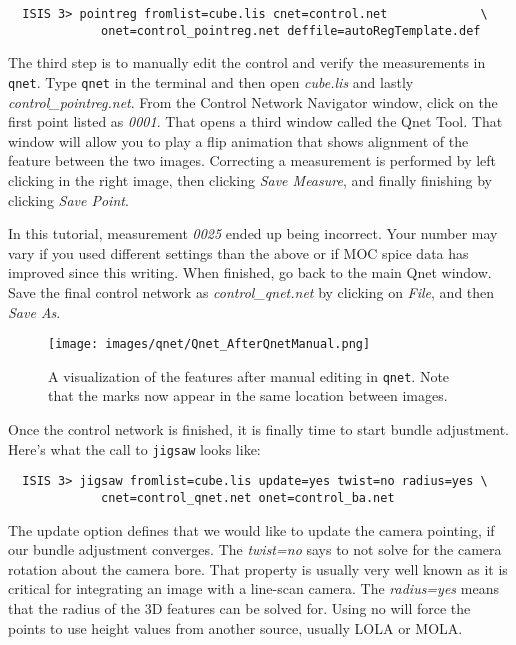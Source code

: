 \begin{verbatim}
  ISIS 3> pointreg fromlist=cube.lis cnet=control.net             \
             onet=control_pointreg.net deffile=autoRegTemplate.def
\end{verbatim}

The third step is to manually edit the control and verify the
measurements in \texttt{qnet}. Type \texttt{qnet} in the terminal and
then open \textit{cube.lis} and lastly
\textit{control\_pointreg.net}. From the Control Network Navigator
window, click on the first point listed as \textit{0001}. That opens a
third window called the Qnet Tool. That window will allow you to play
a flip animation that shows alignment of the feature between the two
images. Correcting a measurement is performed by left clicking in the
right image, then clicking \textit{Save Measure}, and finally
finishing by clicking \textit{Save Point}.

In this tutorial, measurement \textit{0025} ended up being
incorrect. Your number may vary if you used different settings than
the above or if MOC spice data has improved since this writing. When
finished, go back to the main Qnet window. Save the final control
network as \textit{control\_qnet.net} by clicking on \textit{File},
and then \textit{Save As}.

\begin{figure}[ht]
  \centering
  \texttt{[image: images/qnet/Qnet\_AfterQnetManual.png]}
  \caption{A visualization of the features after manual editing in
    \texttt{qnet}. Note that the marks now appear in the same location
    between images.}
  \label{fig:after_autoseed}
\end{figure}

Once the control network is finished, it is finally time to start
bundle adjustment. Here's what the call to \texttt{jigsaw} looks like:

\begin{verbatim}
  ISIS 3> jigsaw fromlist=cube.lis update=yes twist=no radius=yes \
             cnet=control_qnet.net onet=control_ba.net
\end{verbatim}

The update option defines that we would like to update the camera
pointing, if our bundle adjustment converges. The \textit{twist=no}
says to not solve for the camera rotation about the camera bore. That
property is usually very well known as it is critical for integrating
an image with a line-scan camera. The \textit{radius=yes} means that
the radius of the 3D features can be solved for. Using no will force
the points to use height values from another source, usually LOLA or
MOLA.

